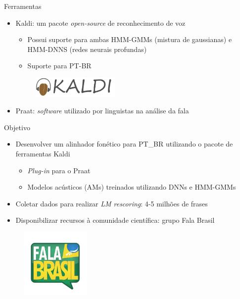 \begin{frame}{Ferramentas}
    \begin{itemize}
        \item Kaldi: um pacote \textit{open-source} de reconhecimento de voz
			\begin{itemize}
				\item Possui suporte para ambas HMM-GMMs (mistura de gaussianas) e HMM-DNNS (redes neurais profundas)
				\item Suporte para PT-BR
			\end{itemize}
		\begin{figure}
		\begin{center}
			\includegraphics[width=0.4\textwidth]{Figures/kaldi}
		\end{center}
		\end{figure}

        \item Praat: \textit{software} utilizado por linguistas na  an\'alise da fala

    \end{itemize}
\end{frame}


\begin{frame}{Objetivo}
\begin{itemize}
	\item Desenvolver um alinhador fon\'etico para PT\_BR utilizando o pacote de ferramentas Kaldi
	\begin{itemize}
		\item \textit{Plug-in} para o Praat
		\item Modelos ac\'usticos (AMs) treinados utilizando DNNs e HMM-GMMs
	\end{itemize}
	\item Coletar dados para realizar \textit{LM rescoring}: 4-5 milh\~oes de frases
    \item Disponibilizar recursos \`a comunidade cient\'ifica: grupo Fala Brasil
\end{itemize}

\begin{figure}
\begin{center}
	\includegraphics[width=0.3\textwidth]{Figures/falabrasil}
\end{center}
\end{figure}

\end{frame}
